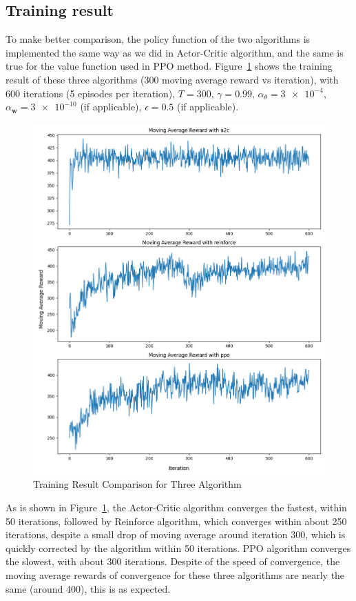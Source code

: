 \documentclass[balance,upint,subscriptcorrection,varvw,mathalfa=cal=boondoxo,pdf-a,colorlinks,nofoot]{asmeconf}
\begin{document}
\subsection{Training result}
\noindent To make better comparison, the policy function of the two algorithms
is implemented the same way as we did in Actor-Critic algorithm, and the same
is true for the value function used in PPO method.
\vspace{3mm}\newline Figure~\ref{fig:3-algorithms-out} shows the training 
result of these three algorithms (300 moving average reward vs iteration), 
with 600 iterations (5 episodes per iteration), \(T=300\), \(\gamma=0.99\),
\(\alpha_\theta=\num{3e-4}\), \(\alpha_{\bm{w}}=\num{3e-10}\) (if applicable),
\(\epsilon=0.5\) (if applicable).
\begin{figure}
    \centering\includegraphics[scale=0.75]{out}
    \caption{Training Result Comparison for Three Algorithm}
    \label{fig:3-algorithms-out}
\end{figure}
As is shown in Figure~\ref{fig:3-algorithms-out}, the Actor-Critic algorithm 
converges the fastest, within 50 iterations, followed by Reinforce algorithm, 
which converges within about 250 iterations, despite a small drop of moving 
average around iteration 300, which is quickly corrected by the algorithm 
within 50 iterations. PPO algorithm converges the slowest, with about 300 
iterations. Despite of the speed of convergence, the moving average rewards 
of convergence for these three algorithms are nearly the same (around 400), 
this is as expected.
\end{document}
